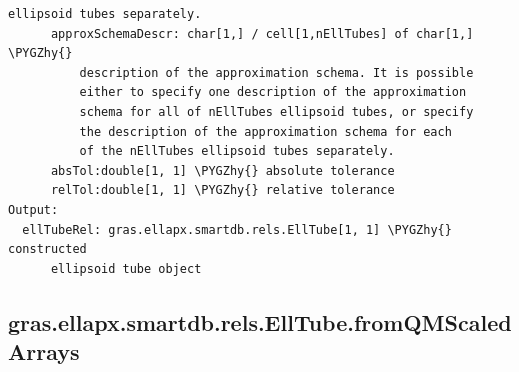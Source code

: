 \documentclass[letterpaper,10pt,english]{sphinxmanual}
\def\PYGZhy{\char`\-}
\begin{document}
\begin{Verbatim}[commandchars=\\\{\}]
          ellipsoid tubes separately.
      approxSchemaDescr: char[1,] / cell[1,nEllTubes] of char[1,] \PYGZhy{}
          description of the approximation schema. It is possible
          either to specify one description of the approximation
          schema for all of nEllTubes ellipsoid tubes, or specify
          the description of the approximation schema for each
          of the nEllTubes ellipsoid tubes separately.
      absTol:double[1, 1] \PYGZhy{} absolute tolerance
      relTol:double[1, 1] \PYGZhy{} relative tolerance
Output:
  ellTubeRel: gras.ellapx.smartdb.rels.EllTube[1, 1] \PYGZhy{} constructed
      ellipsoid tube object
\end{Verbatim}


\subsection{gras.ellapx.smartdb.rels.EllTube.fromQMScaledArrays}
\label{chap_functions:gras-ellapx-smartdb-rels-elltube-fromqmscaledarrays}
\end{document}

